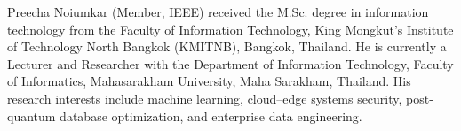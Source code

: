 \documentclass[10pt,journal,compsoc]{IEEEtran}
\begin{document}



\begin{IEEEbiographynophoto}{Preecha Noiumkar}
(Member, IEEE) received the M.Sc. degree in information technology from the Faculty of Information Technology, King Mongkut's Institute of Technology North Bangkok (KMITNB), Bangkok, Thailand. He is currently a Lecturer and Researcher with the Department of Information Technology, Faculty of Informatics, Mahasarakham University, Maha Sarakham, Thailand. His research interests include machine learning, cloud--edge systems security, post-quantum database optimization, and enterprise data engineering.
\end{IEEEbiographynophoto}
\end{document}

